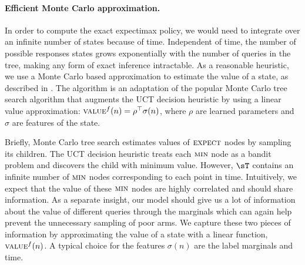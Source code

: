 \paragraph{Efficient Monte Carlo approximation.}

In order to compute the exact expectimax policy, we would need to integrate over an infinite number of states because of time. 
Independent of time, the number of possible responses states grows exponentially with the number of queries in the tree, making any form of exact inference intractable.
As a reasonable heuristic, we use a Monte Carlo based approximation to estimate the value of a state, as described in .
The algorithm is an adaptation of the popular Monte Carlo tree search algorithm\needcite{} that augments the UCT decision heuristic by using a linear value approximation: $\textsc{value}^f(n) = \rho^\top \sigma(n)$, where $\rho$ are learned parameters and $\sigma$ are features of the state. 

Briefly, Monte Carlo tree search estimates values of $\textsc{expect}$ nodes by sampling its children.
The UCT decision heuristic treats each $\textsc{min}$ node as a bandit problem and discovers the child with minimum value.
However, $\sT$ contains an infinite number of $\textsc{min}$ nodes corresponding to each point in time. 
Intuitively, we expect that the value of these $\textsc{min}$ nodes are highly correlated and should share information.
As a separate insight, our model should give us a lot of information about the value of different queries through the marginals which can again help prevent the unnecessary sampling of poor arms.
We capture these two pieces of information by approximating the value of a state with a linear function, $\textsc{value}^f(n)$. 
A typical choice for the features $\sigma(n)$ are the label marginals and time.

%

